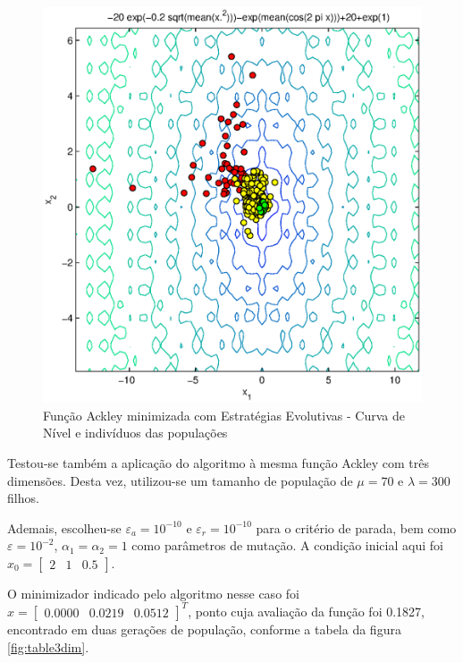 \documentclass[conference,compsoc]{IEEEtran}
\begin{document}
\begin{figure}[!htcb]
\centering
\includegraphics[scale=0.55]{ES_ackley_curvNivel.eps}
\caption{Função Ackley minimizada com Estratégias Evolutivas - Curva de Nível e indivíduos das populações}
\label{fig:ES_ackley_curvNivel}
\end{figure}

Testou-se também a aplicação do algoritmo à mesma função Ackley com três dimensões. Desta vez, utilizou-se um tamanho de população de  $\mu=70$ e $\lambda=300$ filhos.

Ademais, escolheu-se $\varepsilon_a=10^{-10}$ e $\varepsilon_r=10^{-10}$ para o critério de parada, bem como $\varepsilon=10^{-2}$, $\alpha_1=\alpha_2=1$ como parâmetros de mutação. A condição inicial aqui foi $x_0 = \begin{bmatrix}2 &1&0.5\end{bmatrix}.$

O minimizador indicado pelo algoritmo nesse caso foi $x= \begin{bmatrix}0.0000&0.0219&0.0512\end{bmatrix}^T$, ponto cuja avaliação da função foi 0.1827, encontrado em duas gerações de população, conforme a tabela da figura \ref{fig:table3dim}.
\end{document}
